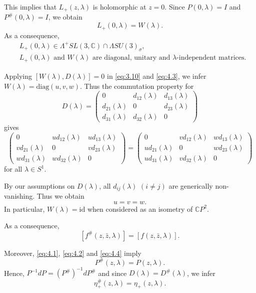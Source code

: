 \documentclass[a4paper,11pt]{amsart}
\theoremstyle{definition}
\numberwithin{equation}{section}
\newcommand{\C}{\mathbb{C}}
\begin{document}
This implies that $L_+(z,\lambda)$ is holomorphic at $z=0$. Since $P(0,\lambda)=I$ and $P^{\#}(0,\lambda)=I$, we obtain
\begin{equation}\label{eq:4.2}
L_+(0,\lambda)=W(\lambda).
\end{equation}
As a consequence, 
\begin{equation}\label{eq:4.3}
\begin{aligned}
& L_+(0,\lambda)\in \Lambda^+ SL(3,\mathbb{C})\cap \Lambda SU(3)_{\sigma},\\
&  L_+(0,\lambda) \text{ and } W(\lambda)  \text{ are diagonal, unitary and } \lambda\text{-independent matrices}.
 \end{aligned}
 \end{equation}
 
 Applying $[W(\lambda), D(\lambda)]=0$ in \eqref{eq:3.10} and \eqref{eq:4.3}, we infer $W(\lambda)=\mathrm{diag} (u,v,w)$. Thus the commutation property for 
 $$D(\lambda)=\begin{pmatrix}
0&d_{12}(\lambda)&d_{13}(\lambda)\\
d_{21}(\lambda)&0&d_{23}(\lambda)\\
d_{31}(\lambda)&d_{32}(\lambda)&0
 \end{pmatrix}$$
 gives
 $$\begin{pmatrix}
0&u d_{12}(\lambda)&u d_{13}(\lambda)\\
v d_{21}(\lambda)&0&v d_{23}(\lambda)\\
w d_{31}(\lambda)&w d_{32}(\lambda)&0
 \end{pmatrix}=\begin{pmatrix}
0&v d_{12}(\lambda)&w d_{13}(\lambda)\\
u d_{21}(\lambda)&0&w d_{23}(\lambda)\\
u d_{31}(\lambda)&v d_{32}(\lambda)&0
 \end{pmatrix}$$
 for all $\lambda\in S^1$.
 
 By our assumptions on $D(\lambda)$, all $d_{ij}(\lambda)$ $(i\neq j)$ are generically non-vanishing. Thus we obtain
 \begin{equation}\label{eq:4.4}
 u=v=w.
 \end{equation}
 In particular, $W(\lambda) = \mathrm{id}$ when considered as an isometry of $\C P^2$.

 As a consequence,
 $$[f^{\#}(z,\bar{z},\lambda)]=[f(z,\bar{z},\lambda)].$$
 
 Moreover, \eqref{eq:4.1}, \eqref{eq:4.2} and \eqref{eq:4.4} imply
 $$P^{\#}(z,\lambda)=P(z,\lambda).$$
Hence, $P^{-1}dP=(P^{\#})^{-1}dP^{\#}$ and since $D(\lambda)=D^{\#}(\lambda)$, we infer
$$\eta_{+}^{\#}(z,\lambda)=\eta_{+}(z,\lambda).$$
\end{document}
